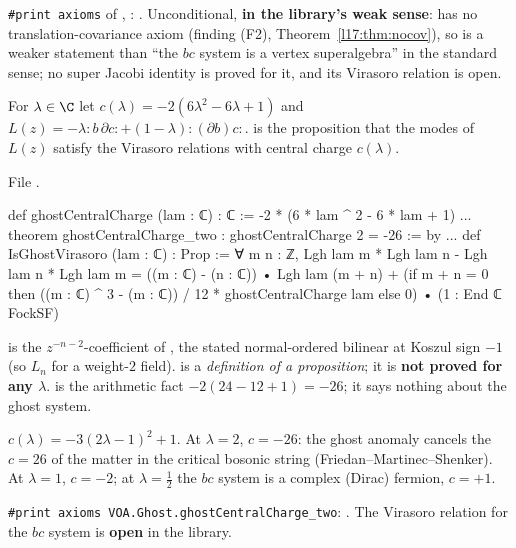 \begin{status}
\texttt{\#print axioms} of , :
. Unconditional, \textbf{in the library's weak sense}: 
has no translation-covariance axiom (finding (F2), Theorem~\ref{l17:thm:nocov}), so  is a weaker statement
than ``the $bc$ system is a vertex superalgebra'' in the standard sense; no super Jacobi identity is proved for it, and its
Virasoro relation is open.
\end{status}

\begin{definition}\label{l17:def:ghostvir}
For $\lambda\in\C$ let $c(\lambda)=-2(6\lambda^2-6\lambda+1)$ and
$L(z)=-\lambda{:}b\,\partial c{:}+(1-\lambda){:}(\partial b)c{:}$.  is the
proposition that the modes of $L(z)$ satisfy the Virasoro relations with central charge $c(\lambda)$.
\end{definition}
\noindent File .
\begin{leancode}
def ghostCentralCharge (lam : ℂ) : ℂ := -2 * (6 * lam ^ 2 - 6 * lam + 1)
...
theorem ghostCentralCharge_two : ghostCentralCharge 2 = -26 := by
...
def IsGhostVirasoro (lam : ℂ) : Prop :=
  ∀ m n : ℤ, Lgh lam m * Lgh lam n - Lgh lam n * Lgh lam m
    = ((m : ℂ) - (n : ℂ)) • Lgh lam (m + n)
      + (if m + n = 0 then ((m : ℂ) ^ 3 - (m : ℂ)) / 12 * ghostCentralCharge lam else 0)
          • (1 : End ℂ FockSF)
\end{leancode}
\begin{dictionary}
 is the $z^{-n-2}$-coefficient of , the stated normal-ordered
bilinear at Koszul sign $-1$ (so $L_n$ for a weight-$2$ field).  is a
\emph{definition of a proposition}; it is \textbf{not proved for any $\lambda$}.
 is the arithmetic fact $-2(24-12+1)=-26$; it says nothing about the
ghost system.
\end{dictionary}
\begin{physics}
$c(\lambda)=-3(2\lambda-1)^2+1$. At $\lambda=2$, $c=-26$: the ghost anomaly cancels the $c=26$ of the
matter in the critical bosonic string (Friedan--Martinec--Shenker). At $\lambda=1$, $c=-2$; at
$\lambda=\frac12$ the $bc$ system is a complex (Dirac) fermion, $c=+1$.
\end{physics}
\begin{status}
\texttt{\#print axioms VOA.Ghost.ghostCentralCharge\_two}: . The Virasoro relation for the $bc$ system is \textbf{open} in the library.
\end{status}

